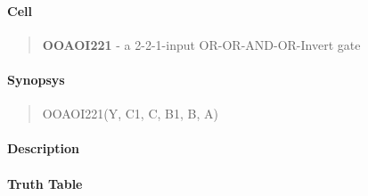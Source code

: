 \label{OOAOI221}
\paragraph{Cell}
\begin{quote}
    \textbf{OOAOI221} - a 2-2-1-input OR-OR-AND-OR-Invert gate
\end{quote}

\paragraph{Synopsys}
\begin{quote}
    OOAOI221(Y, C1, C, B1, B, A)
\end{quote}

\paragraph{Description}

%

\paragraph{Truth Table}
%

